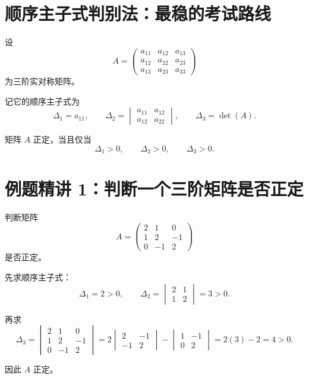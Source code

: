 \documentclass[11pt,oneside,UTF8]{ctexbook}
\begin{document}
\section{顺序主子式判别法：最稳的考试路线}

设
\[
A=
\begin{pmatrix}
a_{11}&a_{12}&a_{13}\\
a_{12}&a_{22}&a_{23}\\
a_{13}&a_{23}&a_{33}
\end{pmatrix}
\]
为三阶实对称矩阵。

记它的顺序主子式为
\[
\Delta_1=a_{11},\qquad
\Delta_2=
\begin{vmatrix}
a_{11}&a_{12}\\
a_{12}&a_{22}
\end{vmatrix},
\qquad
\Delta_3=\det(A).
\]

\begin{summarybox}
矩阵 \(A\) 正定，当且仅当
\[
\Delta_1>0,\qquad \Delta_2>0,\qquad \Delta_3>0.
\]
\end{summarybox}

\section{例题精讲 1：判断一个三阶矩阵是否正定}

\begin{examplebox}[例 10：顺序主子式判别]
判断矩阵
\[
A=
\begin{pmatrix}
2&1&0\\
1&2&-1\\
0&-1&2
\end{pmatrix}
\]
是否正定。

先求顺序主子式：
\[
\Delta_1=2>0,
\qquad
\Delta_2=
\begin{vmatrix}
2&1\\
1&2
\end{vmatrix}
=3>0.
\]

再求
\[
\Delta_3=
\begin{vmatrix}
2&1&0\\
1&2&-1\\
0&-1&2
\end{vmatrix}
=
2
\begin{vmatrix}
2&-1\\
-1&2
\end{vmatrix}
-
\begin{vmatrix}
1&-1\\
0&2
\end{vmatrix}
=2(3)-2=4>0.
\]

因此 \(A\) 正定。
\end{examplebox}
\end{document}
